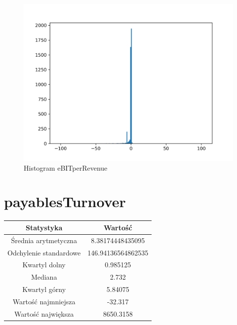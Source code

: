 \documentclass{article}
\begin{document}
\begin{figure}[h!]
    \includegraphics[width=\linewidth]{variables/eBITperRevenue.png}
    \caption{Histogram eBITperRevenue }
\end{figure}\section{ payablesTurnover }

\begin{center}
    \begin{tabular}{|c | c|} 
    \hline
    Statystyka & Wartość \\
    \hline\hline
    Średnia arytmetyczna & 8.38174448435095 \\ 
    \hline
    Odchylenie standardowe & 146.94136564862535 \\
    \hline
    Kwartyl dolny & 0.985125 \\
    \hline
    Mediana & 2.732 \\
    \hline
    Kwartyl górny & 5.84075 \\
    \hline
    Wartość najmniejsza & -32.317 \\
    \hline
    Wartość największa & 8650.3158 \\
    \hline
   \end{tabular}
\end{center}
\end{document}

